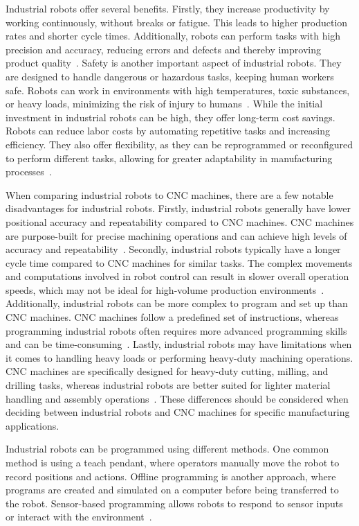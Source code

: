Industrial robots offer several benefits. Firstly, they increase productivity by working continuously, without breaks or fatigue. This leads to higher production rates and shorter cycle times. Additionally, robots can perform tasks with high precision and accuracy, reducing errors and defects and thereby improving product quality~\cite{Kubela.2016}. Safety is another important aspect of industrial robots. They are designed to handle dangerous or hazardous tasks, keeping human workers safe. Robots can work in environments with high temperatures, toxic substances, or heavy loads, minimizing the risk of injury to humans~\cite{Heyer.2010}.
While the initial investment in industrial robots can be high, they offer long-term cost savings. Robots can reduce labor costs by automating repetitive tasks and increasing efficiency. They also offer flexibility, as they can be reprogrammed or reconfigured to perform different tasks, allowing for greater adaptability in manufacturing processes~\cite{Jung.2020b}.

When comparing industrial robots to CNC machines, there are a few notable disadvantages for industrial robots. Firstly, industrial robots generally have lower positional accuracy and repeatability compared to CNC machines. CNC machines are purpose-built for precise machining operations and can achieve high levels of accuracy and repeatability~\cite{Wang.2023}.
Secondly, industrial robots typically have a longer cycle time compared to CNC machines for similar tasks. The complex movements and computations involved in robot control can result in slower overall operation speeds, which may not be ideal for high-volume production environments~\cite{Joshi.2021}.
Additionally, industrial robots can be more complex to program and set up than CNC machines. CNC machines follow a predefined set of instructions, whereas programming industrial robots often requires more advanced programming skills and can be time-consuming~\cite{Ye.2022}. Lastly, industrial robots may have limitations when it comes to handling heavy loads or performing heavy-duty machining operations. CNC machines are specifically designed for heavy-duty cutting, milling, and drilling tasks, whereas industrial robots are better suited for lighter material handling and assembly operations~\cite{Wu.2022}. These differences should be considered when deciding between industrial robots and CNC machines for specific manufacturing applications.

Industrial robots can be programmed using different methods. One common method is using a teach pendant, where operators manually move the robot to record positions and actions. Offline programming is another approach, where programs are created and simulated on a computer before being transferred to the robot. Sensor-based programming allows robots to respond to sensor inputs or interact with the environment~\cite{Heimann.2020}. %


